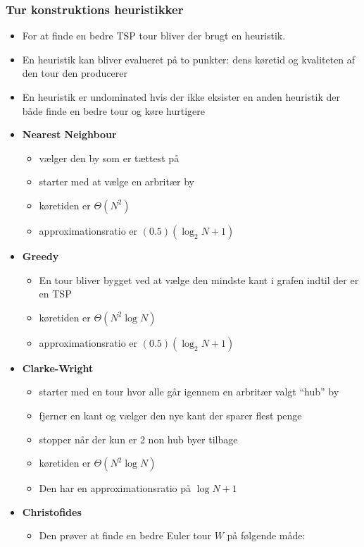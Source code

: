 \subsubsection{Tur konstruktions heuristikker}
\begin{itemize}
	\item For at finde en bedre TSP tour bliver der brugt en heuristik.
  \item En heuristik kan bliver evalueret på to punkter: dens køretid og kvaliteten af den tour den producerer
  \item En heuristik er undominated hvis der ikke eksister en anden heuristik der både finde en bedre tour og køre hurtigere
  \item \textbf{Nearest Neighbour} 
  \begin{itemize}
  	\item vælger den by som er tættest på
    \item starter med at vælge en arbritær by 
    \item køretiden er $\Theta(N^2)$
    \item approximationsratio er $(0.5)(\log_2N + 1)$
  \end{itemize}
  \item \textbf{Greedy}
  \begin{itemize}
  	\item En tour bliver bygget ved at vælge den mindste kant i grafen indtil der er en TSP
  	\item køretiden er $\Theta(N^2 \log N)$
  	\item approximationsratio er $(0.5)(\log_2N + 1)$
  \end{itemize}
  \item \textbf{Clarke-Wright}
  \begin{itemize}
  	\item starter med en tour hvor alle går igennem en arbritær valgt ``hub'' by
    \item fjerner en kant og vælger den nye kant der sparer flest penge
    \item stopper når der kun er 2 non hub byer tilbage
    \item køretiden er $\Theta(N^2 \log N)$ 
    \item Den har en approximationsratio på $\log N +1$ 
  \end{itemize}
  \item \textbf{Christofides}
  \begin{itemize}
  	\item Den prøver at finde en bedre Euler tour $W$ på følgende måde:

\end{itemize}
\end{itemize}

